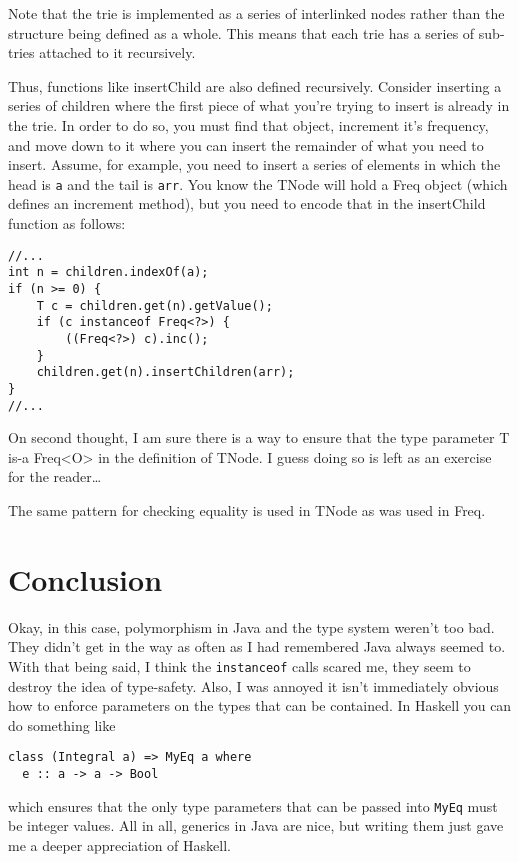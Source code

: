 \documentclass[12pt]{article}
\begin{document}
      Note that the trie is implemented as a series of interlinked nodes rather than the structure being defined as a whole. This means that each trie has a series of sub-tries attached to it recursively.

      Thus, functions like insertChild are also defined recursively. Consider inserting a series of children where the first piece of what you're trying to insert is already in the trie. In order to do so, you must find that object, increment it's frequency, and move down to it where you can insert the remainder of what you need to insert. Assume, for example, you need to insert a series of elements in which the head is \texttt{a} and the tail is \texttt{arr}. You know the TNode will hold a Freq object (which defines an increment method), but you need to encode that in the insertChild function as follows:

      \begin{verbatim}
//...
int n = children.indexOf(a);
if (n >= 0) {
    T c = children.get(n).getValue();
    if (c instanceof Freq<?>) {
        ((Freq<?>) c).inc(); 
    }
    children.get(n).insertChildren(arr);
}
//...
      \end{verbatim}

      On second thought, I am sure there is a way to ensure that the type parameter T is-a Freq<O> in the definition of TNode. I guess doing so is left as an exercise for the reader\ldots

      The same pattern for checking equality is used in TNode as was used in Freq. 

  \section{Conclusion}
    Okay, in this case, polymorphism in Java and the type system weren't too bad. They didn't get in the way as often as I had remembered Java always seemed to. With that being said, I think the \texttt{instanceof} calls scared me, they seem to destroy the idea of type-safety. Also, I was annoyed it isn't immediately obvious how to enforce parameters on the types that can be contained. In Haskell you can do something like 

    \begin{verbatim}
class (Integral a) => MyEq a where
  e :: a -> a -> Bool
    \end{verbatim}

    which ensures that the only type parameters that can be passed into \texttt{MyEq} must be integer values. All in all, generics in Java are nice, but writing them just gave me a deeper appreciation of Haskell. 
\end{document}
